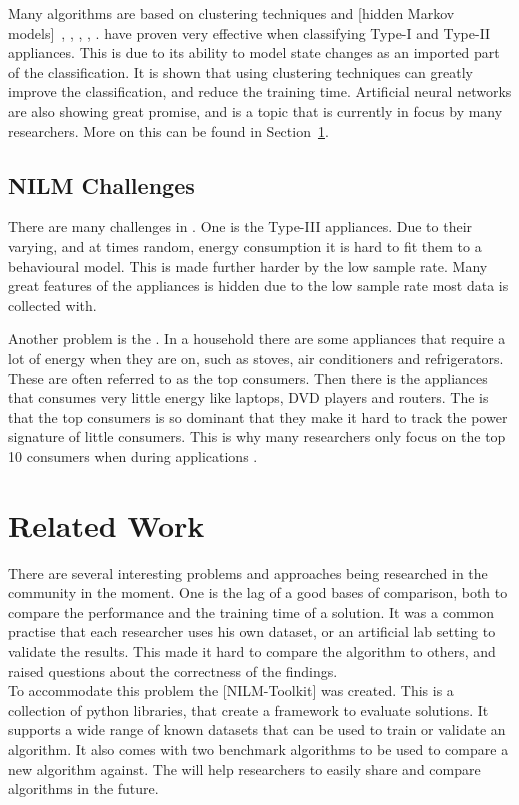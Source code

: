 Many algorithms are based on clustering techniques and [hidden Markov models]~\citep{RefWorks:28}, \citep{RefWorks:26}, \citep{RefWorks:23}, \citep{RefWorks:17}, \citep{RefWorks:24}.  have proven very effective when classifying Type-I and Type-II appliances. This is due to its ability to model state changes as an imported part of the classification. It is shown that using clustering techniques can greatly improve the classification, and reduce the training time. Artificial neural networks are also showing great promise, and is a topic that is currently in focus by many researchers. More on this can be found in Section~\ref{sec:RecRelatedwork}. 

\subsection{NILM Challenges} 
There are many challenges in . One is the Type-III appliances. Due to their varying, and at times random, energy consumption it is hard to fit them to a behavioural model. This is made further harder by the low sample rate. Many great features of the appliances is hidden due to the low sample rate most data is collected with\citep{RefWorks:17}.

Another problem is the . In a household there are some appliances that require a lot of energy when they are on, such as stoves, air conditioners and refrigerators. These are often referred to as the top consumers. Then there is the appliances that consumes very little energy like laptops, DVD players and routers. The  is that the top consumers is so dominant that they make it hard to track the power signature of little consumers. This is why many researchers only focus on the top 10 consumers when during  applications \citep{RefWorks:21}. 

\section{Related Work} 
\label{sec:RecRelatedwork}

There are several interesting problems and approaches being researched in the  community in the moment. One is the lag of a good bases of comparison, both to compare the performance and the training time of a solution. It was a common practise that each researcher uses his own dataset, or an artificial lab setting to validate the results. This made it hard to compare the algorithm to others, and raised questions about the correctness of the findings. \\
To accommodate this problem the [NILM-Toolkit] was created. This is a collection of python libraries, that create a framework to evaluate  solutions. It supports a wide range of known datasets that can be used to train or validate an algorithm. It also comes with two benchmark algorithms to be used to compare a new algorithm against. The  will help researchers to easily share and compare algorithms in the future\citep{RefWorks:21}. 

